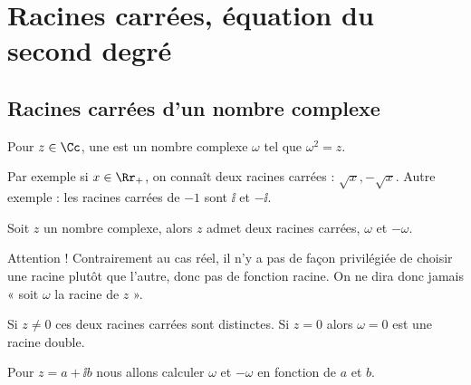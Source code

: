 \documentclass[class=report,crop=false]{standalone}
\begin{document}
\section{Racines carrées, équation du second degré}

\subsection{Racines carrées d'un nombre complexe}

Pour $z \in \Cc$, une  est un nombre complexe $\omega$
tel que $\omega^2 = z$.

Par exemple si $x \in \Rr_+$, on connaît
deux racines carrées : $\sqrt{x}, - \sqrt{x}$. Autre exemple : les racines carrées de
$-1$ sont $\ii $ et $-\ii$.

\begin{proposition}
Soit $z$ un nombre complexe, alors $z$ admet deux racines carrées, $\omega$ et $-\omega$.
\end{proposition}

Attention ! Contrairement au cas réel, il n'y a pas de façon privilégiée de choisir une racine plutôt
que l'autre, donc pas de fonction racine. On ne dira donc jamais « soit $\omega$ la racine de $z$ ». 

Si $z\neq 0$ ces deux racines carrées sont distinctes.
Si $z=0$ alors $\omega=0$ est une racine double.

Pour $z=a + \ii b$ nous allons calculer $\omega$ et $-\omega$ en fonction de $a$ et $b$.
\end{document}
